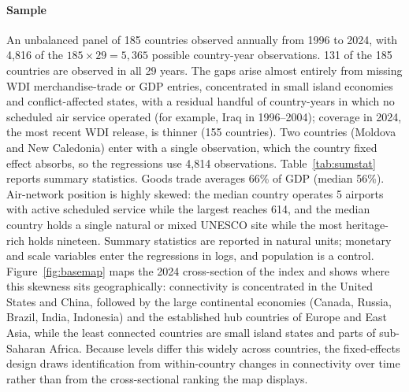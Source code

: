 \paragraph{\textbf{Sample}} An unbalanced panel of 185 countries observed annually from 1996 to 2024, with 4{,}816 of the $185\times29=5{,}365$ possible country-year observations. 131 of the 185 countries are observed in all 29
years. The gaps arise almost entirely from missing WDI merchandise-trade or
GDP entries, concentrated in small island economies and conflict-affected
states, with a residual handful of country-years in which no scheduled air
service operated (for example, Iraq in 1996--2004); coverage in 2024, the most
recent WDI release, is thinner (155 countries). Two countries (Moldova and New
Caledonia) enter with a single observation, which the country fixed effect
absorbs, so the regressions use 4{,}814 observations. Table~\ref{tab:sumstat}
reports summary statistics. Goods trade averages 66\% of GDP (median 56\%). Air-network
position is highly skewed: the median country operates 5 airports with active
scheduled service while the largest reaches 614, and the median country holds a
single natural or mixed UNESCO site while the most heritage-rich holds nineteen.
Summary statistics are reported in natural units; monetary and scale variables
enter the regressions in logs, and population is a control.
Figure~\ref{fig:basemap} maps the 2024 cross-section of the index and shows
where this skewness sits geographically: connectivity is concentrated in the
United States and China, followed by the large continental economies (Canada,
Russia, Brazil, India, Indonesia) and the established hub countries of Europe
and East Asia, while the least connected countries are small island states and
parts of sub-Saharan Africa. Because levels differ this widely across
countries, the fixed-effects design draws identification from within-country
changes in connectivity over time rather than from the cross-sectional ranking
the map displays.

